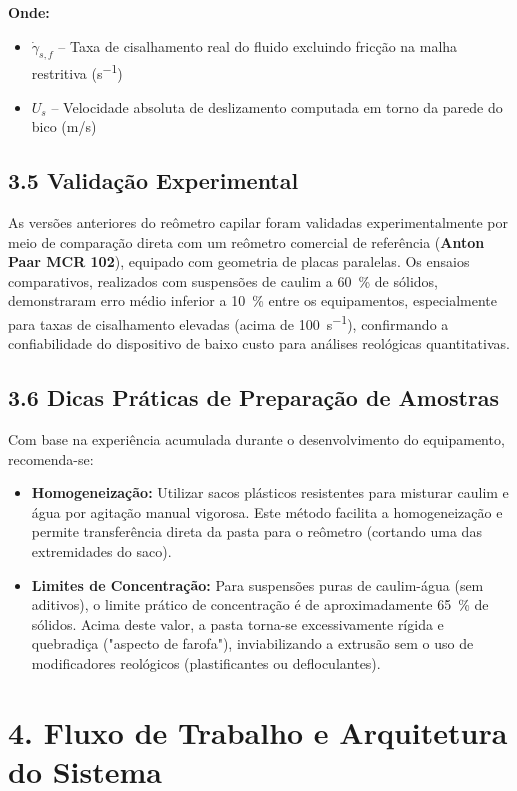 \documentclass[a4paper,12pt]{article}
\begin{document}
\textbf{Onde:}
\begin{itemize}[leftmargin=1.5em]
  \item $\dot{\gamma}_{s,f}$ -- Taxa de cisalhamento real do fluido excluindo fricção na malha restritiva (\si{s^{-1}})
  \item $U_s$ -- Velocidade absoluta de deslizamento computada em torno da parede do bico (\si{m/s})
\end{itemize}

\subsection*{3.5 Validação Experimental}
As versões anteriores do reômetro capilar foram validadas experimentalmente por meio de comparação direta com um reômetro comercial de referência (\textbf{Anton Paar MCR 102}), equipado com geometria de placas paralelas. Os ensaios comparativos, realizados com suspensões de caulim a \SI{60}{\percent} de sólidos, demonstraram erro médio inferior a \SI{10}{\percent} entre os equipamentos, especialmente para taxas de cisalhamento elevadas (acima de \SI{100}{s^{-1}}), confirmando a confiabilidade do dispositivo de baixo custo para análises reológicas quantitativas.

\subsection*{3.6 Dicas Práticas de Preparação de Amostras}
Com base na experiência acumulada durante o desenvolvimento do equipamento, recomenda-se:

\begin{itemize}
  \item \textbf{Homogeneização:} Utilizar sacos plásticos resistentes para misturar caulim e água por agitação manual vigorosa. Este método facilita a homogeneização e permite transferência direta da pasta para o reômetro (cortando uma das extremidades do saco).
  
  \item \textbf{Limites de Concentração:} Para suspensões puras de caulim-água (sem aditivos), o limite prático de concentração é de aproximadamente \SI{65}{\percent} de sólidos. Acima deste valor, a pasta torna-se excessivamente rígida e quebradiça ("aspecto de farofa"), inviabilizando a extrusão sem o uso de modificadores reológicos (plastificantes ou defloculantes).
\end{itemize}

\section*{4. Fluxo de Trabalho e Arquitetura do Sistema}
\end{document}
